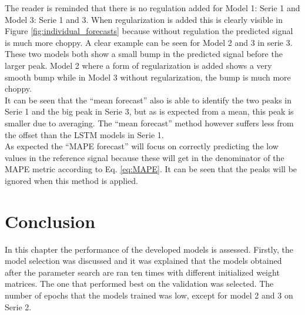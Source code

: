 The reader is reminded that there is no regulation added for Model 1: Serie 1 and Model 3: Serie 1 and 3. When regularization is added this is clearly visible in Figure \ref{fig:individual_forecasts} because without regulation the predicted signal is much more choppy. A clear example can be seen for Model 2 and 3 in serie 3. These two models both show a small bump in the predicted signal before the larger peak. Model 2 where a form of regularization is added shows a very smooth bump while in Model 3 without regularization, the bump is much more choppy. \\

It can be seen that the ``mean forecast'' also is able to identify the two peaks in Serie 1 and the big peak in Serie 3, but as is expected from a mean, this peak is smaller due to averaging. The ``mean forecast'' method however suffers less from the offset than the LSTM models in Serie 1.\\

As expected the ``MAPE forecast'' will focus on correctly predicting the low values in the reference signal because these will get in the denominator of the MAPE metric according to Eq. \ref{eq:MAPE}. It can be seen that the peaks will be ignored when this method is applied. 

\section{Conclusion}
In this chapter the performance of the developed models is assessed. Firstly, the model selection was discussed and it was explained that the models obtained after the parameter search are ran ten times with different initialized weight matrices. The one that performed best on the validation was selected. The number of epochs that the models trained was low, except for model 2 and 3 on Serie 2.\\

